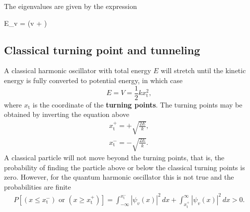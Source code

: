 \documentclass[../Main/chem331-notes.tex]{subfiles}
\begin{document}
The eigenvalues are given by the expression
\begin{iequation}
E_v = \hbar \omega \left(v + \right)
\end{iequation}

\subsection{Classical turning point and tunneling}
A classical harmonic oscillator with total energy $E$ will stretch until the kinetic energy is fully converted to potential energy, in which case
\begin{equation}
E = V = \frac{1}{2} k x_\mathrm{t}^2,
\end{equation}
where $x_\mathrm{t}$ is the coordinate of the \textbf{turning points}.
The turning points may be obtained by inverting the equation above
\begin{align}
x_\mathrm{t}^{+} = + \sqrt{\frac{2 E}{k}}, \\
x_\mathrm{t}^{-} = - \sqrt{\frac{2 E}{k}}.
\end{align}
A classical particle will not move beyond the turning points, that is, the probability of finding the particle above or below the classical turning points is zero.
However, for the quantum harmonic oscillator this is not true and the probabilities are finite
\begin{align}
P [(x \leq x_\mathrm{t}^{-})  \text{ or }  (x \geq x_\mathrm{t}^{+})] = \int_{-\infty}^{x_\mathrm{t}^{-}} |\psi_v(x)|^2 \, dx + \int_{x_\mathrm{t}^{+}}^{\infty} |\psi_v(x)|^2 \, dx > 0.
\end{align}
\end{document}
